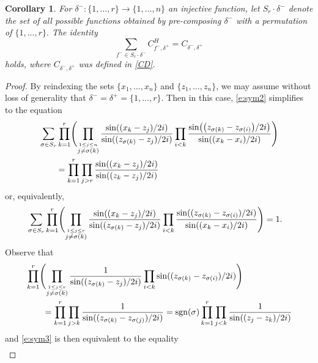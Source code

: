 \documentclass[11pt]{article}
\numberwithin{equation}{section}
\newtheorem{Corollary}[Theorem]{Corollary}
\numberwithin{equation}{section}
\newcommand{\op}[1]{\operatorname{#1}}
\newcommand{\z}{z}
\newcommand{\x}{x}
\begin{document}
\begin{Corollary} For $\delta^-\colon \{1, \dots, r\} \to \{1, \dots, n\}$ an injective function, let $S_r \cdot \delta^-$ denote the set of all possible functions obtained by pre-composing $\delta^-$ with a permutation of $\{1, \dots, r\}.$
The identity
\begin{equation}\label{e:sym2}
\sum_{f^- \in S_r \cdot \delta^-} C^H_{f^-, \delta^+}=C_{\delta^-, \delta^+}
\end{equation}
holds, where $C_{\delta^-, \delta^+}$ was defined in \eqref{CD}.
\end{Corollary}

\begin{proof}
By reindexing the sets $\{\x_1, \dots, \x_n\}$ and $\{\z_1, \dots, \z_n\}$, we may assume without loss of generality that $\delta^- = \delta^+ = \{1, \dots, r\}$. Then in this case, \eqref{e:sym2} simplifies to the equation
\begin{align*}
&\sum_{\sigma \in S_r} \prod_{k=1}^r \Biggl(\prod_{\stackrel{1 \leq j \leq n}{j\neq {\sigma(k)}}}\frac{ \sin( ( \x_{k}- \z_j)/2 {\rm i}) }{\sin(( \z_{\sigma(k)}- \z_j)/2 {\rm i})} \prod_{i<k} \frac{\sin\bigl(\bigl(\z_{\sigma(k)} - \z_{\sigma(i)}\bigr)/2{\rm i}\bigr)}{ \sin((\x_{k} - \x_{i})/2{\rm i})}\Biggr) \nonumber\\
&\qquad{}= \prod_{k=1}^r \prod_{j > r}\frac{ \sin( ( \x_{k}- \z_j)/2 {\rm i}) }{\sin(( \z_{k}- \z_j )/2 {\rm i})}
\end{align*}
or, equivalently,
\begin{align}
&\sum_{\sigma \in S_r} \prod_{k=1}^r \Biggl(\prod_{\stackrel{1 \leq j \leq r}{j\neq {\sigma(k)}}}\frac{ \sin( ( \x_{k}- \z_j)/2 {\rm i}) }{\sin(( \z_{\sigma(k)}- \z_j)/2 {\rm i})} \prod_{i<k} \frac{\sin((\z_{\sigma(k)} - \z_{\sigma(i)})/2{\rm i})}{ \sin((\x_{k} - \x_{i})/2{\rm i})}\Biggr)
= 1 .
\label{e:sym3}
\end{align}
Observe that
\begin{align*}
& \prod_{k=1}^r\Biggl( \prod_{\stackrel{1 \leq j \leq r}{j\neq {\sigma(k)}}} \frac{ 1}{\sin(( \z_{\sigma(k)}- \z_j)/2 {\rm i})}
 \prod_{i<k} \sin((\z_{\sigma(k)} - \z_{\sigma(i)})/2{\rm i}) \Biggr)\\
&\qquad{} = \prod_{k=1}^r \prod_{j>k} \frac{ 1}{\sin(( \z_{\sigma(k)}- \z_{\sigma(j)})/2 {\rm i})}
 = \op{sgn}(\sigma) \prod_{k=1}^r \prod_{j<k} \frac{ 1}{\sin(( \z_{j}- \z_{k})/2 {\rm i})}
\end{align*}
and \eqref{e:sym3} is then equivalent to the equality
\begin{align}

\end{align}
\end{proof}
\end{document}

